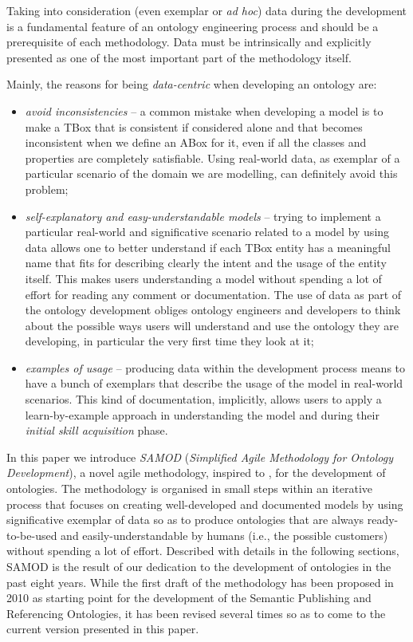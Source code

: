 \documentclass[runningheads,a4paper]{llncs}
\begin{document}
Taking into consideration (even exemplar or {\em ad hoc}) data during the development is a fundamental feature of an ontology engineering process and should be a prerequisite of each methodology. Data must be intrinsically and explicitly presented as one of the most important part of the methodology itself.

Mainly, the reasons for being {\em data-centric} when developing an ontology are:
\begin{itemize}
\item {\em avoid inconsistencies} -- a common mistake when developing a model is to make a TBox that is consistent if considered alone and that becomes inconsistent when we define an ABox for it, even if all the classes and properties are completely satisfiable. Using real-world data, as exemplar of a particular scenario of the domain we are modelling, can definitely avoid this problem;
\item {\em self-explanatory and easy-understandable models} -- trying to implement a particular real-world and significative scenario related to a model by using data allows one to better understand if each TBox entity has a meaningful name that fits for describing clearly the intent and the usage of the entity itself. This makes users understanding a model without spending a lot of effort for reading any comment or documentation. The use of data as part of the ontology development obliges ontology engineers and developers to think about the possible ways users will understand and use the ontology they are developing, in particular the very first time they look at it;
\item {\em examples of usage} -- producing data within the development process means to have a bunch of exemplars that describe the usage of the model in real-world scenarios. This kind of documentation, implicitly, allows users to apply a learn-by-example approach  \cite{__RefNumPara__2359_1461357291} in understanding the model and during their {\em initial skill acquisition} phase.
\end{itemize}

In this paper we introduce {\em SAMOD} ({\em Simplified Agile Methodology for Ontology Development}), a novel agile methodology, inspired to  \cite{__RefNumPara__2367_1461357291}, for the development of ontologies. The methodology is organised in small steps within an iterative process that focuses on creating well-developed and documented models by using significative exemplar of data so as to produce ontologies that are always ready-to-be-used and easily-understandable by humans (i.e., the possible customers) without spending a lot of effort. Described with details in the following sections, SAMOD is the result of our dedication to the development of ontologies in the past eight years. While the first draft of the methodology has been proposed in 2010 as starting point for the development of the Semantic Publishing and Referencing Ontologies, it has been revised several times so as to come to the current version presented in this paper.
\end{document}
